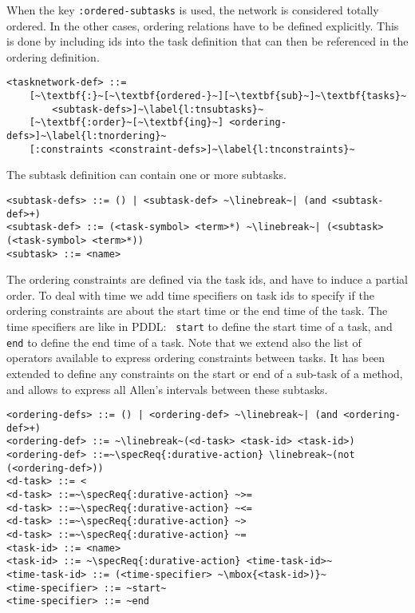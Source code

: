 \documentclass[letterpaper]{article} %
\begin{document}
When the key \verb+:ordered-subtasks+ is used, the network is considered totally ordered. In the other cases, ordering relations have to be defined explicitly. This is done by including ids into the task definition that can then be referenced in the ordering definition.

\begin{lstlisting}[firstnumber=last, escapechar=~]
<tasknetwork-def> ::=
    [~\textbf{:}~[~\textbf{ordered-}~][~\textbf{sub}~]~\textbf{tasks}~
        <subtask-defs>]~\label{l:tnsubtasks}~
    [~\textbf{:order}~[~\textbf{ing}~] <ordering-defs>]~\label{l:tnordering}~
    [:constraints <constraint-defs>]~\label{l:tnconstraints}~
\end{lstlisting}

%
%
\noindent The subtask definition can contain one or more subtasks.

\begin{lstlisting}[firstnumber=last, escapechar=~]
<subtask-defs> ::= () | <subtask-def> ~\linebreak~| (and <subtask-def>+)
<subtask-def> ::= (<task-symbol> <term>*) ~\linebreak~| (<subtask> (<task-symbol> <term>*))
<subtask> ::= <name>
\end{lstlisting}

%
%
The ordering constraints are defined via the task ids, and have to induce a partial order. To deal with time we add time specifiers on task ids to specify if the ordering constraints are about the start time or the end time of the task. The time specifiers are like in PDDL: ~{\tt start} to define the start time of a task, and {\tt end}  to define the end time of a task. Note that we extend also the list of operators available to express ordering constraints between tasks. It has been extended to define any constraints on the start or end of a sub-task of a method, and allows to express all Allen's intervals \citep{allen81} between these subtasks.

\begin{lstlisting}[firstnumber=last, escapechar=~]
<ordering-defs> ::= () | <ordering-def> ~\linebreak~| (and <ordering-def>+)
<ordering-def> ::= ~\linebreak~(<d-task> <task-id> <task-id>)
<ordering-def> ::=~\specReq{:durative-action} \linebreak~(not (<ordering-def>))
<d-task> ::= <
<d-task> ::=~\specReq{:durative-action} ~>=
<d-task> ::=~\specReq{:durative-action} ~<=
<d-task> ::=~\specReq{:durative-action} ~>
<d-task> ::=~\specReq{:durative-action} ~=
<task-id> ::= <name>
<task-id> ::= ~\specReq{:durative-action} <time-task-id>~
<time-task-id> ::= (<time-specifier> ~\mbox{<task-id>)}~
<time-specifier> ::= ~start~
<time-specifier> ::= ~end
\end{lstlisting}
\end{document}

